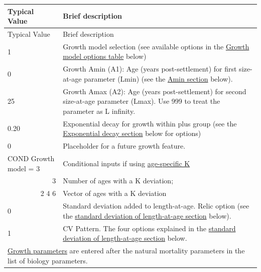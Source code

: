 \begin{longtable}{p{4.5cm} p{10cm}}
	\hline	
    Typical Value & Brief description \Tstrut\Bstrut\\
	\hline
	\endfirsthead

	\hline
	Typical Value & Brief description \Tstrut\Bstrut\\
	\hline
	\endhead
	\hline
	\endfoot
	\endlastfoot

	1 & Growth model selection (see available options in the \hyperlink{GrowthModelOptions}{Growth model options table} below) \Bstrut\\
	\hline

	0 & Growth Amin (A1): Age (years post-settlement) for first size-at-age parameter (Lmin) (see the \hyperlink{AminAmax}{Amin section} below). \Bstrut\\
	\hline

    25 & Growth Amax (A2): Age (years post-settlement) for second size-at-age parameter (Lmax). Use 999 to treat the parameter as L infinity. \Bstrut\\
	\hline
	
	0.20 & Exponential decay for growth within plus group (see the \hyperlink{ExponentialDecay}{Exponential decay section} below for options) \Bstrut\\
	\hline
	
	0 & Placeholder for a future growth feature. \Tstrut\Bstrut\\
	\hline

	COND Growth model = 3 & Conditional inputs if using \hyperlink{AgeSpecificK}{age-specific K} \\
	\multicolumn{1}{r}{3} & Number of ages with a K deviation; \\
	\multicolumn{1}{r}{2 4 6} & Vector of ages with a K deviation \\
	\hline

	0 & Standard deviation added to length-at-age. Relic option (see the \hyperlink{SDLAA}{standard deviation of length-at-age section} below). \Bstrut\\
	\hline

	1 & CV Pattern. The four options explained in the \hyperlink{SDLAA}{standard deviation of length-at-age section} below. \Bstrut\\
	\hline
    
	\multicolumn{2}{l}{\hyperlink{GrowthParameters}{Growth parameters} are entered after the natural mortality parameters in the list of biology parameters.} \\
	\hline

\end{longtable}

